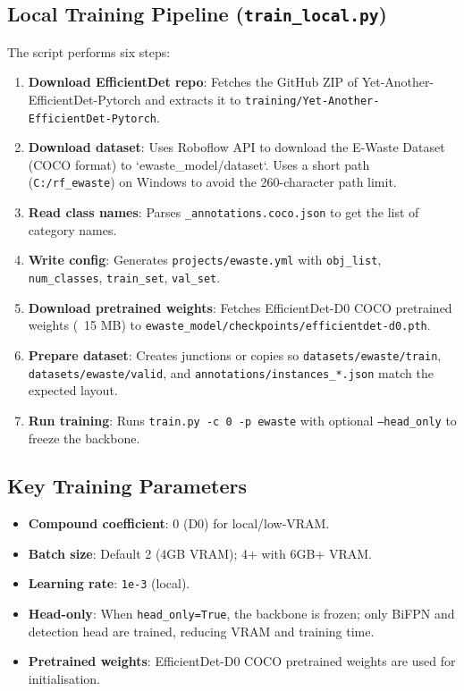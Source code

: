 \documentclass[11pt,a4paper]{article}
\begin{document}
\subsection{Local Training Pipeline (\texttt{train\_local.py})}

The script performs six steps:

\begin{enumerate}
    \item \textbf{Download EfficientDet repo}: Fetches the GitHub ZIP of Yet-Another-EfficientDet-Pytorch and extracts it to \texttt{training/Yet-Another-EfficientDet-Pytorch}.
    \item \textbf{Download dataset}: Uses Roboflow API to download the E-Waste Dataset (COCO format) to `ewaste\_model/dataset`. Uses a short path (\texttt{C:/rf\_ewaste}) on Windows to avoid the 260-character path limit.
    \item \textbf{Read class names}: Parses \texttt{\_annotations.coco.json} to get the list of category names.
    \item \textbf{Write config}: Generates \texttt{projects/ewaste.yml} with \texttt{obj\_list}, \texttt{num\_classes}, \texttt{train\_set}, \texttt{val\_set}.
    \item \textbf{Download pretrained weights}: Fetches EfficientDet-D0 COCO pretrained weights (~15 MB) to \texttt{ewaste\_model/checkpoints/efficientdet-d0.pth}.
    \item \textbf{Prepare dataset}: Creates junctions or copies so \texttt{datasets/ewaste/train}, \texttt{datasets/ewaste/valid}, and \texttt{annotations/instances\_*.json} match the expected layout.
    \item \textbf{Run training}: Runs \texttt{train.py -c 0 -p ewaste} with optional \texttt{--head\_only} to freeze the backbone.
\end{enumerate}

\subsection{Key Training Parameters}

\begin{itemize}
    \item \textbf{Compound coefficient}: 0 (D0) for local/low-VRAM.
    \item \textbf{Batch size}: Default 2 (4GB VRAM); 4+ with 6GB+ VRAM.
    \item \textbf{Learning rate}: \texttt{1e-3} (local).
    \item \textbf{Head-only}: When \texttt{head\_only=True}, the backbone is frozen; only BiFPN and detection head are trained, reducing VRAM and training time.
    \item \textbf{Pretrained weights}: EfficientDet-D0 COCO pretrained weights are used for initialisation.
\end{itemize}
\end{document}

